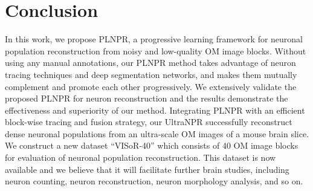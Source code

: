 \documentclass[journal]{IEEEtran}
\begin{document}
%







\section{Conclusion}
\label{sec:conclusion}
In this work, we propose PLNPR, a progressive learning framework for neuronal population reconstruction from noisy and low-quality OM image blocks.
Without using any manual annotations, our PLNPR method takes advantage of neuron tracing techniques and deep segmentation networks, and makes them mutually complement and promote each other progressively.
We extensively validate the proposed PLNPR for neuron reconstruction and the results demonstrate the effectiveness and superiority of our method.
Integrating PLNPR with an efficient block-wise tracing and fusion strategy, our UltraNPR successfully reconstruct dense neuronal populations from an ultra-scale OM images of a mouse brain slice.
%
We construct a new dataset ``VISoR-40'' which consists of 40 OM image blocks for evaluation of neuronal population reconstruction.
This dataset is now available and we believe that it will facilitate further brain studies, including neuron counting, neuron reconstruction, neuron morphology analysis, and so on.


%
\end{document}
